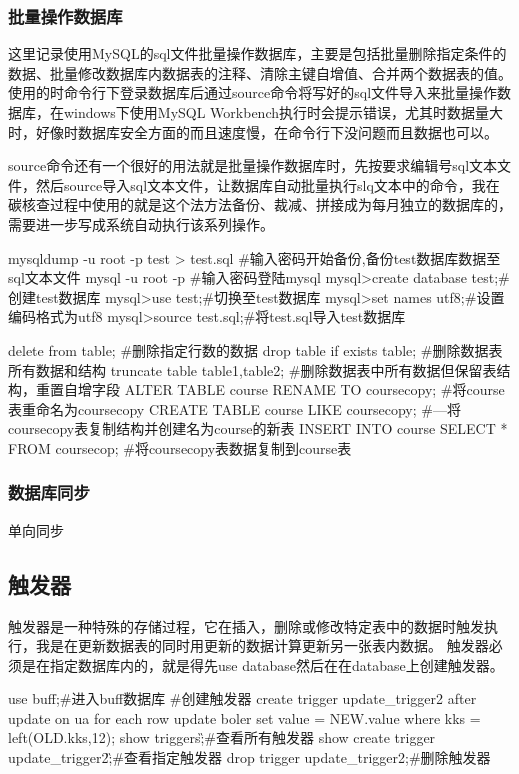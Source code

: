 \subsubsection{批量操作数据库}
这里记录使用MySQL的sql文件批量操作数据库，主要是包括批量删除指定条件的数据、批量修改数据库内数据表的注释、清除主键自增值、合并两个数据表的值。使用的时命令行下登录数据库后通过source命令将写好的sql文件导入来批量操作数据库，在windows下使用MySQL Workbench执行时会提示错误，尤其时数据量大时，好像时数据库安全方面的而且速度慢，在命令行下没问题而且数据也可以。

source命令还有一个很好的用法就是批量操作数据库时，先按要求编辑号sql文本文件，然后source导入sql文本文件，让数据库自动批量执行slq文本中的命令，我在碳核查过程中使用的就是这个法方法备份、裁减、拼接成为每月独立的数据库的，需要进一步写成系统自动执行该系列操作。
\begin{shell}
mysqldump -u root -p test > test.sql
#输入密码开始备份,备份test数据库数据至sql文本文件
mysql -u root -p
#输入密码登陆mysql
mysql>create database test;#创建test数据库
mysql>use test;#切换至test数据库
mysql>set names utf8;#设置编码格式为utf8
mysql>source test.sql;#将test.sql导入test数据库
\end{shell}
\begin{shell}
delete from table;
#删除指定行数的数据
drop table if exists table;
#删除数据表所有数据和结构
truncate table table1,table2;
#删除数据表中所有数据但保留表结构，重置自增字段
ALTER TABLE course RENAME TO coursecopy;
#将course表重命名为coursecopy
CREATE TABLE course LIKE coursecopy;
#—将coursecopy表复制结构并创建名为course的新表
INSERT INTO course SELECT * FROM coursecop;
#将coursecopy表数据复制到course表
\end{shell}
\subsubsection{数据库同步}
单向同步
\subsection{触发器}
触发器是一种特殊的存储过程，它在插入，删除或修改特定表中的数据时触发执行，我是在更新数据表的同时用更新的数据计算更新另一张表内数据。
触发器必须是在指定数据库内的，就是得先use database然后在在database上创建触发器。
\begin{shell}
use buff;#进入buff数据库
#创建触发器
create trigger update_trigger2 after update on ua for each row update boler set value = NEW.value where kks = left(OLD.kks,12);
show triggers\G;#查看所有触发器
show create trigger update_trigger2\G;#查看指定触发器
drop trigger update_trigger2;#删除触发器
\end{shell}
